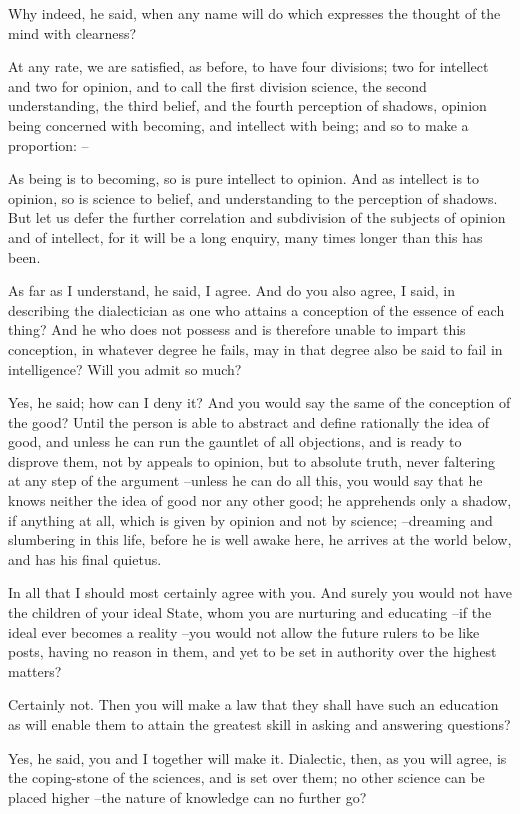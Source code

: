 Why indeed, he said, when any name will do which expresses the thought of the mind with clearness?

At any rate, we are satisfied, as before, to have four divisions; two for intellect and two for opinion, and to call the first division science, the second understanding, the third belief, and the fourth perception of shadows, opinion being concerned with becoming, and intellect with being; and so to make a proportion: --

As being is to becoming, so is pure intellect to opinion.
And as intellect is to opinion, so is science to belief, and understanding to the perception of shadows. But let us defer the further correlation and subdivision of the subjects of opinion and of intellect, for it will be a long enquiry, many times longer than this has been.

As far as I understand, he said, I agree.
And do you also agree, I said, in describing the dialectician as one who attains a conception of the essence of each thing? And he who does not possess and is therefore unable to impart this conception, in whatever degree he fails, may in that degree also be said to fail in intelligence? Will you admit so much?

Yes, he said; how can I deny it?
And you would say the same of the conception of the good?
Until the person is able to abstract and define rationally the idea of good, and unless he can run the gauntlet of all objections, and is ready to disprove them, not by appeals to opinion, but to absolute truth, never faltering at any step of the argument --unless he can do all this, you would say that he knows neither the idea of good nor any other good; he apprehends only a shadow, if anything at all, which is given by opinion and not by science; --dreaming and slumbering in this life, before he is well awake here, he arrives at the world below, and has his final quietus.

In all that I should most certainly agree with you.
And surely you would not have the children of your ideal State, whom you are nurturing and educating --if the ideal ever becomes a reality --you would not allow the future rulers to be like posts, having no reason in them, and yet to be set in authority over the highest matters?

Certainly not.
Then you will make a law that they shall have such an education as will enable them to attain the greatest skill in asking and answering questions?

Yes, he said, you and I together will make it.
Dialectic, then, as you will agree, is the coping-stone of the sciences, and is set over them; no other science can be placed higher --the nature of knowledge can no further go?


